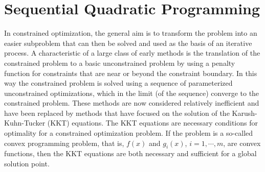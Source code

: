 \documentclass[journal,comsoc]{IEEEtran}
\begin{document}
%



\section{Sequential Quadratic Programming}

In constrained optimization, the general aim is to transform the problem into an easier subproblem that can then be solved and used as the basis of an iterative process. A characteristic of a large class of early methods is the translation of the constrained problem to a basic unconstrained problem by using a penalty function for constraints that are near or beyond the constraint boundary. In this way the constrained problem is solved using a sequence of parameterized unconstrained optimizations, which in the limit (of the sequence) converge to the constrained problem. These methods are now considered relatively inefficient and have been replaced by methods that have focused on the solution of the Karush-Kuhn-Tucker (KKT) equations. The KKT equations are necessary conditions for optimality for a constrained optimization problem. If the problem is a so-called convex programming problem, that is, $f(x)$ and $g_i(x)$, $i = 1,\cdots,m$, are convex functions, then the KKT equations are both necessary and sufficient for a global solution point.
\end{document}

